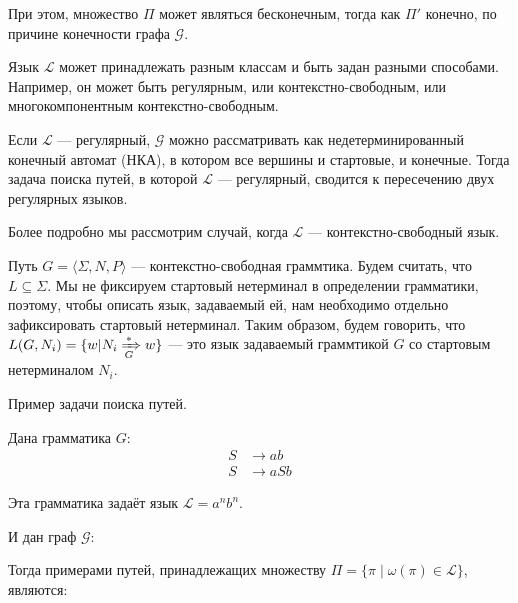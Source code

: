 При этом, множество $\Pi$ может являться бесконечным, тогда как $\Pi'$ конечно, по причине конечности графа $\mathcal{G}$.

Язык $\mathcal{L}$ может принадлежать разным классам и быть задан разными способами. Например, он может быть регулярным, или контекстно-свободным, или многокомпонентным контекстно-свободным.

Если $\mathcal{L}$ --- регулярный, $\mathcal{G}$ можно рассматривать как недетерминированный конечный автомат (НКА), в котором все вершины и стартовые, и конечные.
Тогда задача поиска путей, в которой $\mathcal{L}$ --- регулярный, сводится к пересечению двух регулярных языков.

Более подробно мы рассмотрим случай, когда $\mathcal{L}$ --- контекстно-свободный язык.

Путь $G = \langle \Sigma, N, P \rangle$ --- контекстно-свободная граммтика.
Будем считать, что $L \subseteq \Sigma$.
Мы не фиксируем стартовый нетерминал в определении грамматики, поэтому, чтобы описать язык, задаваемый ей, нам необходимо отдельно зафиксировать стартовый нетерминал.
Таким образом, будем говорить, что $L(G,N_i) = \{ w | N_i \xRightarrow[G]{*} w  \}$ --- это язык задаваемый граммтикой $G$ со стартовым нетерминалом $N_i$.

\begin{example}
    Пример задачи поиска путей.

    Дана грамматика  $G:$
    \begin{align*}
    S   &\to a b \\
    S   &\to a S b
    \end{align*}

    Эта грамматика задаёт язык $\mathcal{L} = a^n b^n$.

    И дан граф $\mathcal{G}:$

    \begin{center}
      
    \end{center}

    Тогда примерами путей, принадлежащих множеству $\Pi = \{\pi \mid \omega(\pi) \in \mathcal{L}\}$, являются:

    \begin{center}
        
    \end{center}

    \begin{center}
        
    \end{center}

\end{example}



